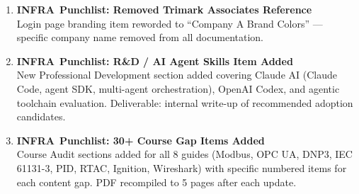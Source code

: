 \documentclass[10pt]{article}
\newcommand{\infra}{\textcolor{samber}{\small\bfseries INFRA}}
\begin{document}
\begin{enumerate}[resume]\small
  \item \infra\ \textbf{Punchlist: Removed Trimark Associates Reference} \\
    Login page branding item reworded to ``Company A Brand Colors'' — specific company name removed from all documentation.

  \item \infra\ \textbf{Punchlist: R\&D / AI Agent Skills Item Added} \\
    New Professional Development section added covering Claude AI (Claude Code, agent SDK, multi-agent orchestration), OpenAI Codex, and agentic toolchain evaluation. Deliverable: internal write-up of recommended adoption candidates.

  \item \infra\ \textbf{Punchlist: 30+ Course Gap Items Added} \\
    Course Audit sections added for all 8 guides (Modbus, OPC UA, DNP3, IEC 61131-3, PID, RTAC, Ignition, Wireshark) with specific numbered items for each content gap. PDF recompiled to 5 pages after each update.
\end{enumerate}

\vfill

\end{document}

